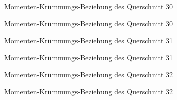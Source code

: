 \documentclass[
  11pt,
  letterpaper,
]{scrreprt}
\begin{document}
\begin{figure}[H]


\caption{\label{fig-qs_30}Momenten-Krümmungs-Beziehung des Querschnitt
30}

\end{figure}%

\begin{figure}[H]


\caption{\label{fig-m_chi_30}Momenten-Krümmungs-Beziehung des
Querschnitt 30}

\end{figure}%

\begin{figure}[H]


\caption{\label{fig-qs_31}Momenten-Krümmungs-Beziehung des Querschnitt
31}

\end{figure}%

\begin{figure}[H]


\caption{\label{fig-m_chi_31}Momenten-Krümmungs-Beziehung des
Querschnitt 31}

\end{figure}%

\begin{figure}[H]


\caption{\label{fig-qs_32}Momenten-Krümmungs-Beziehung des Querschnitt
32}

\end{figure}%

\begin{figure}[H]


\caption{\label{fig-m_chi_32}Momenten-Krümmungs-Beziehung des
Querschnitt 32}

\end{figure}%
\end{document}
